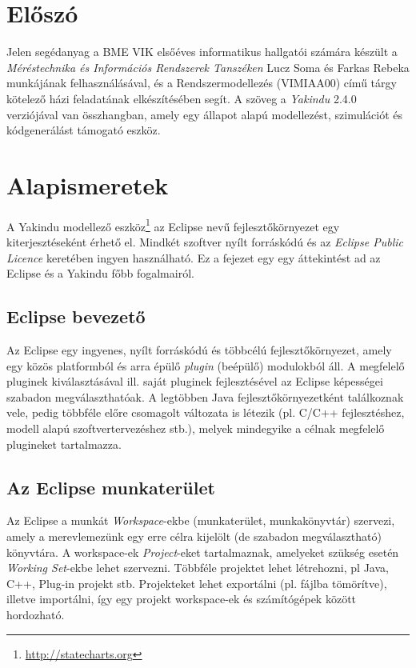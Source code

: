 
\graphicspath{ {./hf/figures/} }

\section{Előszó}

Jelen segédanyag a BME VIK elsőéves informatikus hallgatói számára készült a \emph{Méréstechnika és Információs Rendszerek Tanszéken} Lucz Soma és Farkas Rebeka munkájának felhasználásával, és a Rendszermodellezés (VIMIAA00) című tárgy kötelező házi feladatának elkészítésében segít. A szöveg a \emph{Yakindu} 2.4.0 verziójával van összhangban, amely egy állapot alapú modellezést, szimulációt és kódgenerálást támogató eszköz.


\section{Alapismeretek}

A Yakindu modellező eszköz\footnote{\url{http://statecharts.org}} az Eclipse nevű fejlesztőkörnyezet egy kiterjesztéseként érhető el. Mindkét szoftver nyílt forráskódú és az \emph{Eclipse Public Licence} keretében ingyen használható. Ez a fejezet egy egy áttekintést ad az Eclipse és a Yakindu főbb fogalmairól.

\subsection{Eclipse bevezető}

Az Eclipse egy ingyenes, nyílt forráskódú és többcélú fejlesztőkörnyezet, amely egy közös platformból és arra épülő \emph{plugin} (beépülő) modulokból áll. A megfelelő pluginek kiválasztásával ill. saját pluginek fejlesztésével az Eclipse képességei szabadon megválaszthatóak. A legtöbben Java fejlesztőkörnyezetként találkoznak vele, pedig többféle előre csomagolt változata is létezik (pl. C/C++ fejlesztéshez, modell alapú szoftvertervezéshez stb.), melyek mindegyike a célnak megfelelő plugineket tartalmazza.

\subsection{Az Eclipse munkaterület}

Az Eclipse a munkát \emph{Workspace}-ekbe (munkaterület, munkakönyvtár) szervezi, amely a merevlemezünk egy erre célra kijelölt (de szabadon megválasztható) könyvtára. A workspace-ek \emph{Project}-eket tartalmaznak, amelyeket szükség esetén \emph{Working Set}-ekbe lehet szervezni. Többféle projektet lehet létrehozni, pl Java, C++, Plug-in projekt stb. Projekteket lehet exportálni (pl.  fájlba tömörítve), illetve importálni, így egy projekt workspace-ek és számítógépek között hordozható.

